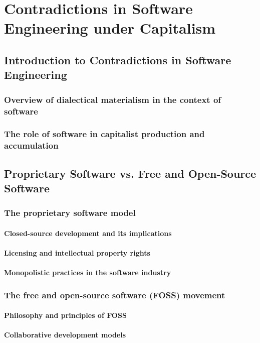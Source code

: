 \chapter{Contradictions in Software Engineering under Capitalism}

\section{Introduction to Contradictions in Software Engineering}
\subsection{Overview of dialectical materialism in the context of software}
\subsection{The role of software in capitalist production and accumulation}

\newpage
\section{Proprietary Software vs. Free and Open-Source Software}
\subsection{The proprietary software model}
\subsubsection{Closed-source development and its implications}
\subsubsection{Licensing and intellectual property rights}
\subsubsection{Monopolistic practices in the software industry}
\subsection{The free and open-source software (FOSS) movement}
\subsubsection{Philosophy and principles of FOSS}
\subsubsection{Collaborative development models}
